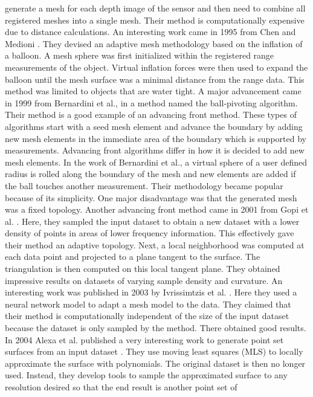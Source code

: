 generate a mesh for each depth image of the sensor and then need to combine all
registered meshes into a single mesh. Their method is computationally expensive
due to distance calculations. An interesting work came in 1995 from Chen and
Medioni \cite{Chen1995}. They devised an adaptive mesh methodology based on the
inflation of a balloon. A mesh sphere was first initialized within the
registered range measurements of the object. Virtual inflation forces were then
used to expand the balloon until the mesh surface was a minimal distance from
the range data. This method was limited to objects that are water tight. A
major advancement came in 1999 from Bernardini et al., \cite{Bernardini1999a} in
a method named the ball-pivoting algorithm. Their method is a good example of an
advancing front method. These types of algorithms start with a seed mesh element
and advance the boundary by adding new mesh elements in the immediate area of
the boundary which is supported by measurements. Advancing front algorithms
differ in how it is decided to add new mesh elements. In the work of Bernardini
et al., a virtual sphere of a user defined radius is rolled along the boundary of
the mesh and new elements are added if the ball touches another measurement.
Their methodology became popular because of its simplicity. One major
disadvantage was that the generated mesh was a fixed topology. Another advancing
front method came in 2001 from Gopi et al. \cite{Gopi2001,Gopi2002}. Here, they
sampled the input dataset to obtain a new dataset with a lower density of points
in areas of lower frequency information. This effectively gave their method an
adaptive topology. Next, a local neighborhood was computed at each data point
and projected to a plane tangent to the surface. The triangulation is then
computed on this local tangent plane. They obtained impressive results on
datasets of varying sample density and curvature. An interesting work was
published in 2003 by Ivrissimtzis et al. \cite{Ivrissimtzis2003}. Here they used
a neural network model to adapt a mesh model to the data. They claimed that
their method is computationally independent of the size of the input dataset
because the dataset is only sampled by the method. There obtained good results.
In 2004 Alexa et al. published a very interesting work to generate point set
surfaces from an input dataset \cite{Alexa2004}. They use moving least squares
(MLS) to locally approximate the surface with polynomials. The original dataset
is then no longer used. Instead, they develop tools to sample the approximated
surface to any resolution desired so that the end result is another point set of
